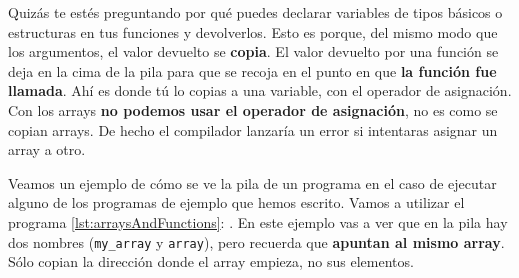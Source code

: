 \documentclass[a4paper]{article}
\begin{document}
Quizás te estés
preguntando por qué puedes declarar
variables de tipos básicos o estructuras en tus funciones y
devolverlos. Esto es porque, del mismo modo que los argumentos, el valor
devuelto se \textbf{copia}. El valor devuelto por una función se deja
en la cima de la pila para que se recoja en el punto en que \textbf{la función
fue llamada}. Ahí es donde tú lo copias a una variable, con el operador
de asignación. Con los arrays \textbf{no podemos usar el operador de
asignación}, no es como se copian arrays. De hecho el compilador lanzaría un
error si intentaras asignar un array a otro.


Veamos un ejemplo de cómo se ve la pila de un programa en el caso de ejecutar
alguno de los programas de ejemplo que hemos escrito. Vamos a utilizar el
programa \ref{lst:arraysAndFunctions}: .
En este ejemplo vas a ver que en la pila hay dos nombres (\verb!my_array! y
\verb!array!), pero recuerda que \textbf{apuntan al mismo array}. Sólo copian
la dirección donde el array empieza, no sus elementos.
\end{document}
